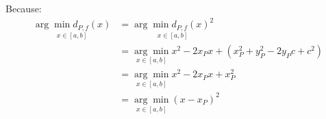 Because:
\begin{align}
    \underset{x\in[a,b]}{\arg \min d_{P,f}(x)} &= \underset{x\in[a,b]}{\arg \min d_{P,f}(x)^2}\\
   &=\underset{x\in[a,b]}{\arg \min} x^2 - 2x_P x + (x_P^2 + y_P^2 - 2 y_P c + c^2)\\
   &=\underset{x\in[a,b]}{\arg \min} x^2 - 2 x_P x + x_P^2\\
   &=\underset{x\in[a,b]}{\arg \min} (x-x_P)^2
\end{align}

